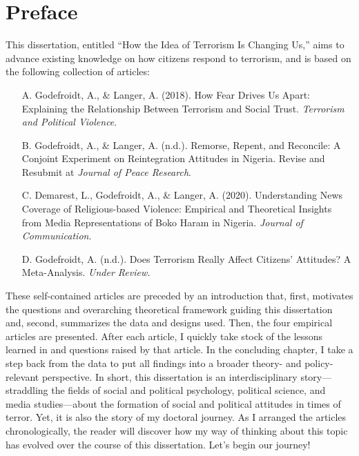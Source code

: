 
\chapter*{Preface}

\vspace{-5mm}
\lettrine[loversize=-0.2,lines=1]{T}{}his dissertation, entitled ``How the Idea of Terrorism Is Changing Us,'' aims to advance existing knowledge on how citizens respond to terrorism, and is based on the following collection of articles:

\begin{itemize}
    \item[A.] Godefroidt, A., \& Langer, A. (2018). How Fear Drives Us Apart: Explaining the Relationship Between Terrorism and Social Trust. \textit{Terrorism and Political Violence}.
    \item[B.] Godefroidt, A., \& Langer, A. (n.d.). Remorse, Repent, and Reconcile: A Conjoint Experiment on Reintegration Attitudes in Nigeria. Revise and Resubmit at \textit{Journal of Peace Research}.
    \item[C.] Demarest, L., Godefroidt, A., \& Langer, A. (2020). Understanding News Coverage of Religious-based Violence: Empirical and Theoretical Insights from Media Representations of Boko Haram in Nigeria. \textit{Journal of Communication}.
    \item[D.] Godefroidt, A. (n.d.). Does Terrorism Really Affect Citizens' Attitudes? A Meta-Analysis. \textit{Under Review.}
\end{itemize}

\noindent These self-contained articles are preceded by an introduction that, first, motivates the questions and overarching theoretical framework guiding this dissertation and, second, summarizes the data and designs used. Then, the four empirical articles are presented. After each article, I quickly take stock of the lessons learned in and questions raised by that article. In the concluding chapter, I take a step back from the data to put all findings into a broader theory- and policy-relevant perspective. In short, this dissertation is an interdisciplinary story---straddling the fields of  social and political psychology, political science, and media studies---about the formation of social and political attitudes in times of terror. Yet, it is also the story of my doctoral journey. As I arranged the articles chronologically, the reader will discover how my way of thinking about this topic has evolved over the course of this dissertation. Let's begin our journey!

\clearpage